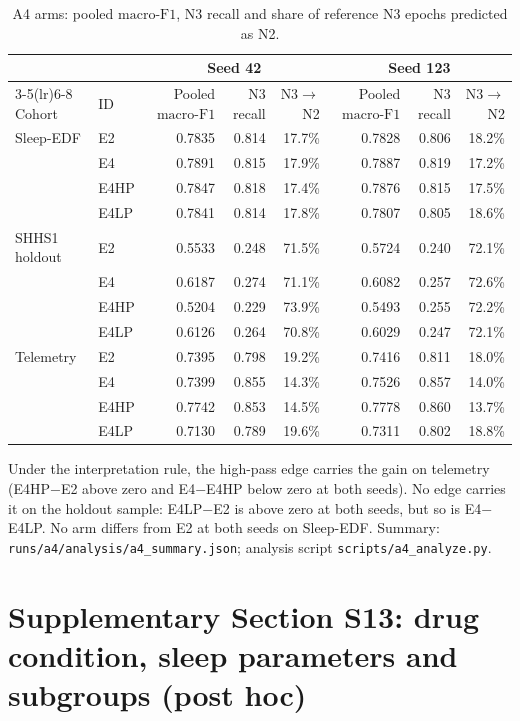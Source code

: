 \documentclass[10pt,a4paper]{article}
\newcommand{\mf}{\ensuremath{\mathrm{macro\text{-}F1}}}
\begin{document}
\begin{table}[H]
\centering\scriptsize
\caption{A4 arms: pooled \mf, N3 recall and share of reference N3 epochs predicted as N2.}
\label{tab:sup_a4_arms}
\begin{tabular}{llrrrrrr}
\toprule
& & \multicolumn{3}{c}{Seed 42} & \multicolumn{3}{c}{Seed 123} \\
\cmidrule(lr){3-5}\cmidrule(lr){6-8}
Cohort & ID & Pooled \mf & N3 recall & N3$\to$N2 & Pooled \mf & N3 recall & N3$\to$N2 \\
\midrule
Sleep-EDF & E2 & 0.7835 & 0.814 & 17.7\% & 0.7828 & 0.806 & 18.2\% \\
 & E4 & 0.7891 & 0.815 & 17.9\% & 0.7887 & 0.819 & 17.2\% \\
 & E4HP & 0.7847 & 0.818 & 17.4\% & 0.7876 & 0.815 & 17.5\% \\
 & E4LP & 0.7841 & 0.814 & 17.8\% & 0.7807 & 0.805 & 18.6\% \\
\addlinespace
SHHS1 holdout & E2 & 0.5533 & 0.248 & 71.5\% & 0.5724 & 0.240 & 72.1\% \\
 & E4 & 0.6187 & 0.274 & 71.1\% & 0.6082 & 0.257 & 72.6\% \\
 & E4HP & 0.5204 & 0.229 & 73.9\% & 0.5493 & 0.255 & 72.2\% \\
 & E4LP & 0.6126 & 0.264 & 70.8\% & 0.6029 & 0.247 & 72.1\% \\
\addlinespace
Telemetry & E2 & 0.7395 & 0.798 & 19.2\% & 0.7416 & 0.811 & 18.0\% \\
 & E4 & 0.7399 & 0.855 & 14.3\% & 0.7526 & 0.857 & 14.0\% \\
 & E4HP & 0.7742 & 0.853 & 14.5\% & 0.7778 & 0.860 & 13.7\% \\
 & E4LP & 0.7130 & 0.789 & 19.6\% & 0.7311 & 0.802 & 18.8\% \\
\bottomrule
\end{tabular}
\end{table}

Under the interpretation rule, the high-pass edge carries the gain on telemetry (E4HP$-$E2 above zero and E4$-$E4HP
below zero at both seeds). No edge carries it on the holdout sample: E4LP$-$E2 is above zero at both seeds, but so is
E4$-$E4LP. No arm differs from E2 at both seeds on Sleep-EDF. Summary:
\nolinkurl{runs/a4/analysis/a4_summary.json}; analysis script \nolinkurl{scripts/a4_analyze.py}.

\section*{Supplementary Section S13: drug condition, sleep parameters and subgroups (post hoc)}
\label{sec:sup_revision}
\end{document}
